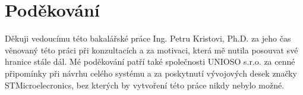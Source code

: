 \chapter*{Poděkování}
Děkuji vedoucímu této bakalářské práce Ing. Petru Kristovi, Ph.D. za jeho čas věnovaný této práci při konzultacích a za motivaci, která mě nutila posouvat své hranice stále dál. Mé poděkování patří také společnosti UNIOSO s.r.o. za cenné připomínky při návrhu celého systému a za poskytnutí vývojových desek značky STMicroelecronics, bez kterých by vytvoření této práce nikdy nebylo možné.
